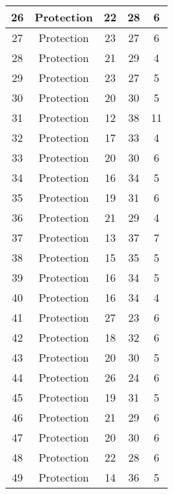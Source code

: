 \documentclass[results.tex]{subfiles}
\begin{document}
\begin{center}
\begin{tabular}{| c || c | c | c | c |}
    \hline
    26 & Protection & 22 & 28 & 6 \\ 
    \hline
    27 & Protection & 23 & 27 & 6 \\ 
    \hline
    28 & Protection & 21 & 29 & 4 \\ 
    \hline
    29 & Protection & 23 & 27 & 5 \\ 
    \hline
    30 & Protection & 20 & 30 & 5 \\ 
    \hline
    31 & Protection & 12 & 38 & 11 \\ 
    \hline
    32 & Protection & 17 & 33 & 4 \\ 
    \hline
    33 & Protection & 20 & 30 & 6 \\ 
    \hline
    34 & Protection & 16 & 34 & 5 \\ 
    \hline
    35 & Protection & 19 & 31 & 6 \\ 
    \hline
    36 & Protection & 21 & 29 & 4 \\ 
    \hline
    37 & Protection & 13 & 37 & 7 \\ 
    \hline
    38 & Protection & 15 & 35 & 5 \\ 
    \hline
    39 & Protection & 16 & 34 & 5 \\ 
    \hline
    40 & Protection & 16 & 34 & 4 \\ 
    \hline
    41 & Protection & 27 & 23 & 6 \\ 
    \hline
    42 & Protection & 18 & 32 & 6 \\ 
    \hline
    43 & Protection & 20 & 30 & 5 \\ 
    \hline
    44 & Protection & 26 & 24 & 6 \\ 
    \hline
    45 & Protection & 19 & 31 & 5 \\ 
    \hline
    46 & Protection & 21 & 29 & 6 \\ 
    \hline
    47 & Protection & 20 & 30 & 6 \\ 
    \hline
    48 & Protection & 22 & 28 & 6 \\ 
    \hline
    49 & Protection & 14 & 36 & 5 \\ 
    \hline   \end{tabular}
\end{center}
\end{document}
